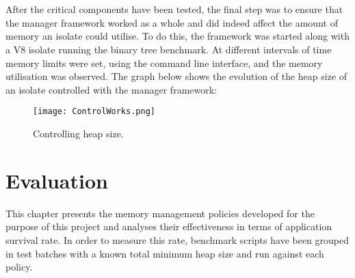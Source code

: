 \documentclass{l4proj}
\begin{document}
\\\\
 After the critical components have been tested, the final step was to ensure that the manager framework worked as a whole and did indeed affect the amount of memory an isolate could utilise. To do this, the framework was started along with a V8 isolate running the binary tree benchmark. At different intervals of time memory limits were set, using the command line interface, and the memory utilisation was observed. The graph below shows the evolution of the heap size of an isolate controlled with the manager framework:
\begin{figure}[!ht]
  \centering
    \texttt{[image: ControlWorks.png]}
  \caption{Controlling heap size.}
\end{figure}

\chapter{Evaluation}
\hspace*{3em} This chapter presents the memory management policies developed for the purpose of this project and analyses their effectiveness in terms of application survival rate. In order to measure this rate, benchmark scripts have been grouped in test batches with a known total minimum heap size and run against each policy.
\end{document}
